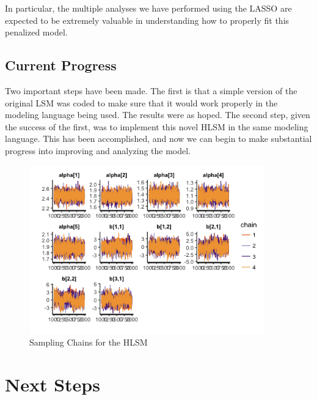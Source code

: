 \documentclass[11pt]{scrartcl}
\begin{document}
In particular, the multiple analyses we have performed using the LASSO are expected to be extremely valuable in understanding how to properly fit this penalized model.

\subsection{Current Progress}
Two important steps have been made. The first is that a simple version of the original LSM was coded to make sure that it would work properly in the modeling language being used. The results were as hoped. The second step, given the success of the first, was to implement this novel HLSM in the same modeling language. This has been accomplished, and now we can begin to make substantial progress into improving and analyzing the model.


\begin{figure}
	\centering
	\includegraphics[width=4in]{hlsm_traceplot}
	\caption{Sampling Chains for the HLSM}
	\label{fig:chains}
\end{figure}

\section{Next Steps}
\end{document}
